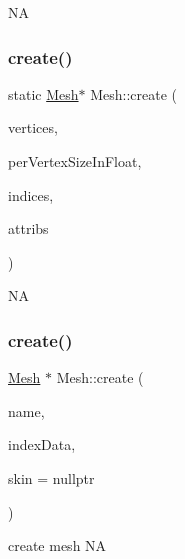 NA \mbox{\label{classMesh_a4563d7c3ec3ddc78e06c552169749975}} 
\subsubsection{\texorpdfstring{create()}{create()}\hspace{0.1cm}{\footnotesize\ttfamily [6/8]}}
{\footnotesize\ttfamily static \hyperlink{classMesh}{Mesh}$\ast$ Mesh\+::create (\begin{DoxyParamCaption}\item[{const std\+::vector$<$ float $>$ \&}]{vertices,  }\item[{int}]{per\+Vertex\+Size\+In\+Float,  }\item[{const Index\+Array \&}]{indices,  }\item[{const std\+::vector$<$ \hyperlink{structMeshVertexAttrib}{Mesh\+Vertex\+Attrib} $>$ \&}]{attribs }\end{DoxyParamCaption})\hspace{0.3cm}{\ttfamily [static]}}

NA \mbox{\label{classMesh_a182577b1a4f6d49f36cd489e30448d3f}} 
\subsubsection{\texorpdfstring{create()}{create()}\hspace{0.1cm}{\footnotesize\ttfamily [7/8]}}
{\footnotesize\ttfamily \hyperlink{classMesh}{Mesh} $\ast$ Mesh\+::create (\begin{DoxyParamCaption}\item[{const std\+::string \&}]{name,  }\item[{\hyperlink{classMeshIndexData}{Mesh\+Index\+Data} $\ast$}]{index\+Data,  }\item[{\hyperlink{classMeshSkin}{Mesh\+Skin} $\ast$}]{skin = {\ttfamily nullptr} }\end{DoxyParamCaption})\hspace{0.3cm}{\ttfamily [static]}}

create mesh  NA \mbox{\label{classMesh_ae362fa6755a83ff158b7f84924cb4e9e}} 
